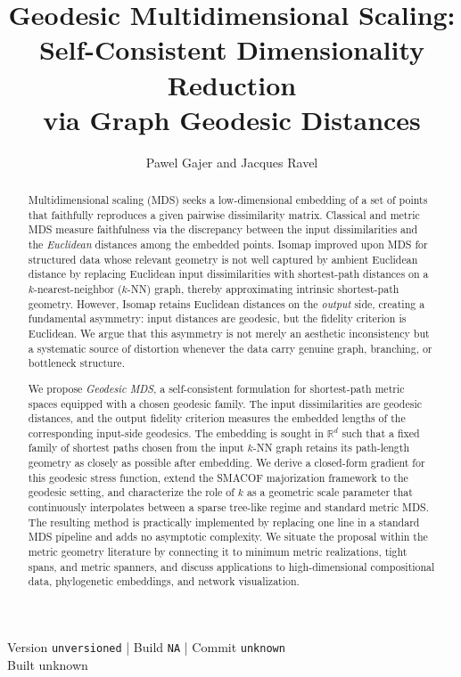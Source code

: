 \documentclass[11pt]{article}
\newcommand{\R}{\mathbb{R}}
\providecommand{\manuscriptversion}{unversioned}
\providecommand{\manuscriptbuildnumber}{NA}
\providecommand{\manuscriptcommit}{unknown}
\providecommand{\manuscriptbuilddatetime}{unknown}
\begin{document}
\title{Geodesic Multidimensional Scaling:\\
       Self-Consistent Dimensionality Reduction\\ via Graph Geodesic Distances}

\author{Pawel Gajer and Jacques Ravel}
\date{}

\maketitle
\thispagestyle{firstpage}
\begin{center}
\footnotesize
Version \texttt{\manuscriptversion} \quad | \quad Build
\texttt{\manuscriptbuildnumber} \quad | \quad Commit
\texttt{\manuscriptcommit}\\
Built \manuscriptbuilddatetime
\end{center}
\vspace{0.6em}

\begin{abstract}
Multidimensional scaling (MDS) seeks a low-dimensional embedding of
a set of points that faithfully reproduces a given pairwise dissimilarity
matrix.  Classical and metric MDS measure faithfulness via the discrepancy
between the input dissimilarities and the \emph{Euclidean} distances among
the embedded points.  Isomap improved upon MDS for structured data whose
relevant geometry is not well captured by ambient Euclidean distance by
replacing Euclidean input dissimilarities with shortest-path distances on a
$k$-nearest-neighbor ($k$-NN) graph, thereby approximating intrinsic
shortest-path geometry.  However, Isomap retains Euclidean distances on the
\emph{output} side, creating a fundamental asymmetry: input distances are
geodesic, but the fidelity criterion is Euclidean.  We argue that this
asymmetry is not merely an aesthetic inconsistency but a systematic source
of distortion whenever the data carry genuine graph, branching, or
bottleneck structure.

We propose \emph{Geodesic MDS}, a self-consistent formulation for
shortest-path metric spaces equipped with a chosen geodesic family.  The
input dissimilarities are geodesic distances, and the output fidelity criterion
measures the embedded lengths of the corresponding input-side geodesics.  The
embedding is sought in $\R^d$ such that a fixed family of shortest paths
chosen from the input $k$-NN graph retains its path-length geometry as
closely as possible after embedding.  We derive a closed-form
gradient for this geodesic stress function, extend the SMACOF majorization
framework to the geodesic setting, and characterize the role of $k$ as a
geometric scale parameter that continuously interpolates between a sparse
tree-like regime and standard metric MDS.  The resulting method is
practically implemented by replacing one line in a standard MDS pipeline
and adds no asymptotic complexity.  We situate the proposal within the
metric geometry literature by connecting it to minimum metric realizations,
tight spans, and metric spanners, and discuss applications to
high-dimensional compositional data, phylogenetic embeddings, and network
visualization.
\end{abstract}
\end{document}
